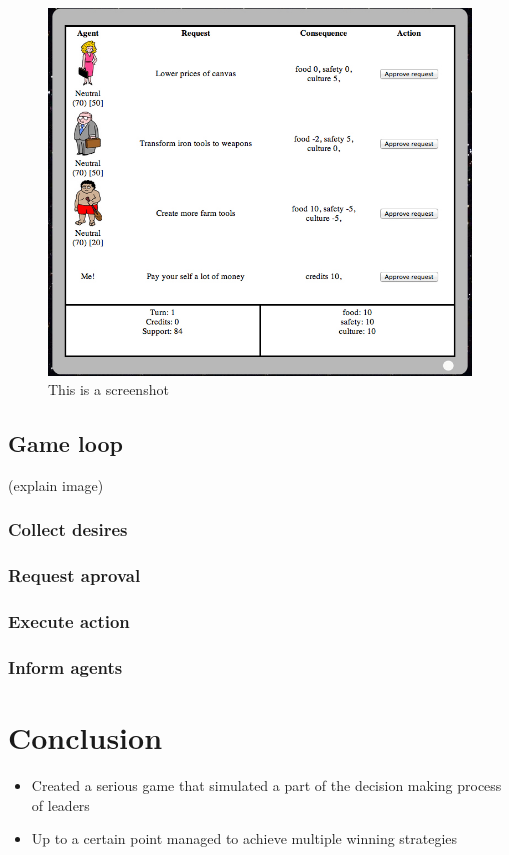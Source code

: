 \documentclass[11pt,a4paper]{article}
\begin{document}
\begin{figure}[h!]
\centering
\includegraphics[scale=0.5]{screenshot}
\caption{This is a screenshot}
\label{fig:scr}
\end{figure}



  \subsection{Game loop} 
  (explain image)
    \subsubsection{Collect desires}
    \subsubsection{Request aproval}
    \subsubsection{Execute action}
    \subsubsection{Inform agents}


\section{Conclusion}
  \begin{itemize}
    \item Created a serious game that simulated a part of the decision making process of leaders
    \item Up to a certain point managed to achieve multiple winning strategies
  \end{itemize}
\end{document}
